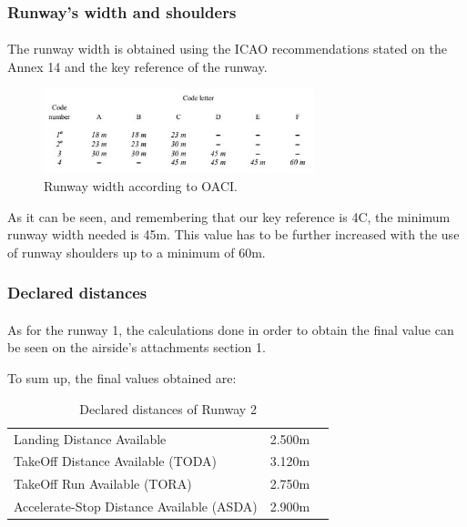 		\subsubsection{Runway's width and shoulders}
		\paragraph{}The runway width is obtained using the ICAO recommendations stated on the Annex 14 and the key reference of the runway. 
	
		\begin{figure}[H]
			\centering
			\includegraphics[clip, trim=0cm 0cm 0cm 0cm, width=0.7\textwidth]{./images/Annex14/RunwayWidth}
			\caption{Runway width according to OACI.} %
			\label{} %
		\end{figure}
	
		As it can be seen, and remembering that our key reference is 4C, the minimum runway width needed is 45m. This value has to be further increased with the use of runway shoulders up to a minimum of 60m. 
	
		\subsubsection{Declared distances}
		\paragraph{} As for the runway 1, the calculations done in order to obtain the final value can be seen on the airside’s attachments section 1. 
	
		To sum up, the final values obtained are:
	
		\begin{table}[htb]
			\centering
			\begin{tabular}{ll p{5cm}}
				\midrule[2pt]
				Landing Distance Available & 2.500m\\
				TakeOff Distance Available (TODA) & 3.120m\\
				TakeOff Run Available (TORA)& 2.750m\\
				Accelerate-Stop Distance Available (ASDA)& 2.900m\\
				\bottomrule[2pt]
			\end{tabular}
			\caption{Declared distances of  Runway 2}
			\label{DeclareddistancesRW2}
		\end{table}
	

